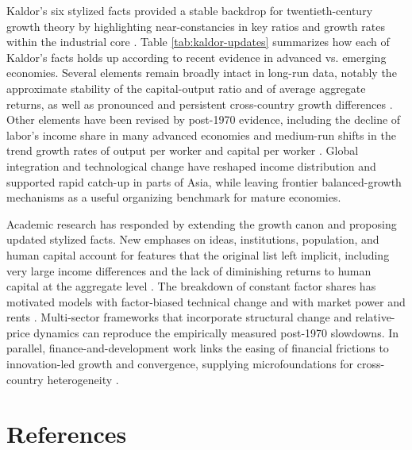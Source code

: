\documentclass[\topdir/lecture\_notes.tex]{subfiles}
\begin{document}
Kaldor's six stylized facts provided a stable backdrop for twentieth-century growth theory by highlighting near-constancies in key ratios and growth rates within the industrial core \parencite{kaldor1957model,kaldor1961capital,jones2016facts}.
Table \ref{tab:kaldor-updates} summarizes how each of Kaldor's facts holds up according to recent evidence in advanced vs. emerging economies.
Several elements remain broadly intact in long-run data, notably the approximate stability of the capital-output ratio and of average aggregate returns, as well as pronounced and persistent cross-country growth differences \parencite{herrendorf2014growth,herrendorf2019kaldor,jorda2019rate,pritchett1997divergence,bolt2018rebasing}.
Other elements have been revised by post-1970 evidence, including the decline of labor's income share in many advanced economies and medium-run shifts in the trend growth rates of output per worker and capital per worker \parencite{karabarbounis2014global,elsby2013decline,imf2017weo,gordon2016rise,fernald2015productivity,herrendorf2014growth,byrneolinersichel2017}.
Global integration and technological change have reshaped income distribution and supported rapid catch-up in parts of Asia, while leaving frontier balanced-growth mechanisms as a useful organizing benchmark for mature economies\parencite{baldwin2016great,young1995tyranny,collinsbosworth1996,feenstrainklaartimmer2015pwt,solow1956contribution,kingrebelo1993,jones2016facts}.

Academic research has responded by extending the growth canon and proposing updated stylized facts.
New emphases on ideas, institutions, population, and human capital account for features that the original list left implicit, including very large income differences and the lack of diminishing returns to human capital at the aggregate level \parencite{jones2010new}.
The breakdown of constant factor shares has motivated models with factor-biased technical change and with market power and rents \parencite{acemoglu2002directed,acemoglu2003laborcapaugment,deloecker2020markups,barkai2020declining}.
Multi-sector frameworks that incorporate structural change and relative-price dynamics can reproduce the empirically measured post-1970 slowdowns\parencite{herrendorf2014growth,herrendorf2019kaldor,duernecker2021productivity}.
In parallel, finance-and-development work links the easing of financial frictions to innovation-led growth and convergence, supplying microfoundations for cross-country heterogeneity \parencite{aghion2018finance}.

\section{References}

\nocite{karabarbounis2014global}
\nocite{elsby2013decline}
\nocite{imf2017weo}
\nocite{oecd2012labourlosing}
\nocite{acemoglu2018race}
\nocite{autor2013china}
\nocite{autor2020superstar}
\nocite{deloecker2020markups}
\nocite{barkai2020declining}
\nocite{gollin2002getting}
\nocite{rognlie2015deciphering}
\nocite{koh2024longrun}
\nocite{dao2017why}

\printbibliography[heading=none]
\end{document}

